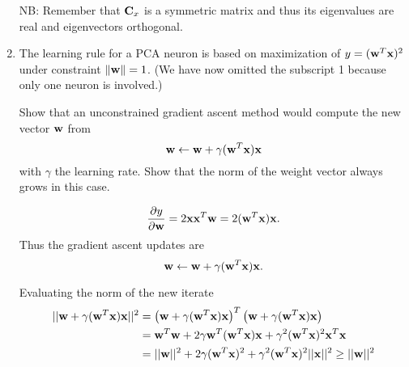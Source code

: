 \begin{enumerate}
\begin{solution}
    NB: Remember that $\mathbf{C}_x$ is a symmetric matrix and thus its
    eigenvalues are real and eigenvectors orthogonal.

  \end{solution}
  

\item The learning rule for a PCA neuron is based on maximization of
  $y=({\bf w}^T{\bf x})^2$ under constraint $ \| {\bf w} \| = 1$. (We have now omitted the
  subscript 1 because only one neuron is involved.)

  Show that an unconstrained gradient ascent method would compute the
  new vector ${\bf w}$ from
  \[
  {\bf w} \leftarrow {\bf w} + \gamma ({\bf w}^T{\bf x}){\bf x}
  \]
  with $\gamma$ the learning rate. Show that the norm of the weight
  vector always grows in this case.

  \begin{solution}


    \begin{equation*}
      \frac{\partial y}{\partial \mathbf{w}} = 2 \mathbf{x} \mathbf{x}^T \mathbf{w} = 2 (\mathbf{w}^T \mathbf{x}) \mathbf{x}.
    \end{equation*}
    Thus the gradient ascent updates are
    \begin{equation*}
      \mathbf{w} \leftarrow \mathbf{w} + \gamma (\mathbf{w}^T \mathbf{x}) \mathbf{x}.
    \end{equation*}

    Evaluating the norm of the new iterate
    \begin{equation*}
      \begin{split}
        ||\mathbf{w} + \gamma (\mathbf{w}^T \mathbf{x}) \mathbf{x}||^2
        &= \left(\mathbf{w} + \gamma (\mathbf{w}^T \mathbf{x}) \mathbf{x}\right)^T
        \left(\mathbf{w} + \gamma (\mathbf{w}^T \mathbf{x}) \mathbf{x}\right) \\
        &= \mathbf{w}^T \mathbf{w} + 2 \gamma \mathbf{w}^T (\mathbf{w}^T \mathbf{x}) \mathbf{x} + \gamma^2 (\mathbf{w}^T \mathbf{x})^2 \mathbf{x}^T \mathbf{x} \\
        &= ||\mathbf{w}||^2 + 2 \gamma (\mathbf{w}^T \mathbf{x})^2 + \gamma^2 (\mathbf{w}^T \mathbf{x})^2 ||\mathbf{x}||^2
        \ge ||\mathbf{w}||^2
      \end{split}
    \end{equation*}

  \end{solution}
  
\end{enumerate}

